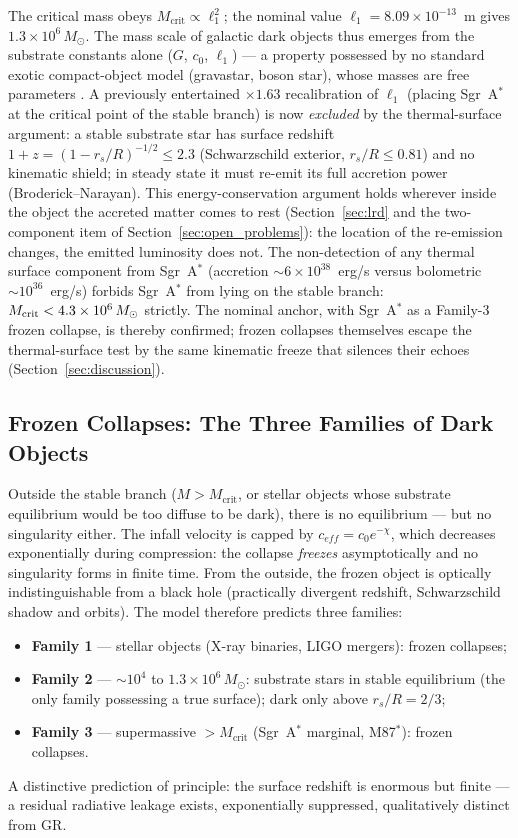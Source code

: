 \documentclass[11pt,a4paper]{article}
\theoremstyle{plain}
\theoremstyle{remark}
\begin{document}
The critical mass obeys $M_{\text{crit}} \propto \ell_1^2$; the nominal value $\ell_1 = 8.09\times10^{-13}$~m gives $1.3\times10^{6}\,M_\odot$. The mass scale of galactic dark objects thus emerges from the substrate constants alone ($G$, $c_0$, $\ell_1$) --- a property possessed by no standard exotic compact-object model (gravastar, boson star), whose masses are free parameters \cite{mazur2001, mazur2023}. A previously entertained $\times1.63$ recalibration of $\ell_1$ (placing Sgr~A$^*$ at the critical point of the stable branch) is now \emph{excluded} by the thermal-surface argument: a stable substrate star has surface redshift $1+z = (1 - r_s/R)^{-1/2} \le 2.3$ (Schwarzschild exterior, $r_s/R \le 0.81$) and no kinematic shield; in steady state it must re-emit its full accretion power (Broderick--Narayan). This energy-conservation argument holds wherever inside the object the accreted matter comes to rest (Section~\ref{sec:lrd} and the two-component item of Section~\ref{sec:open_problems}): the location of the re-emission changes, the emitted luminosity does not. The non-detection of any thermal surface component from Sgr~A$^*$ (accretion $\sim 6\times10^{38}$~erg/s versus bolometric $\sim 10^{36}$~erg/s) forbids Sgr~A$^*$ from lying on the stable branch: $M_{\rm crit} < 4.3\times10^{6}\,M_\odot$ strictly. The nominal anchor, with Sgr~A$^*$ as a Family-3 frozen collapse, is thereby confirmed; frozen collapses themselves escape the thermal-surface test by the same kinematic freeze that silences their echoes (Section~\ref{sec:discussion}).

\subsection{Frozen Collapses: The Three Families of Dark Objects}
Outside the stable branch ($M > M_{\text{crit}}$, or stellar objects whose substrate equilibrium would be too diffuse to be dark), there is no equilibrium --- but no singularity either. The infall velocity is capped by $c_{eff} = c_0 e^{-\chi}$, which decreases exponentially during compression: the collapse \emph{freezes} asymptotically and no singularity forms in finite time. From the outside, the frozen object is optically indistinguishable from a black hole (practically divergent redshift, Schwarzschild shadow and orbits). The model therefore predicts three families:
\begin{itemize}
    \item \textbf{Family 1} --- stellar objects (X-ray binaries, LIGO mergers): frozen collapses;
    \item \textbf{Family 2} --- $\sim10^{4}$ to $1.3\times10^{6}\,M_\odot$: substrate stars in stable equilibrium (the only family possessing a true surface); dark only above $r_s/R = 2/3$;
    \item \textbf{Family 3} --- supermassive $> M_{\text{crit}}$ (Sgr~A$^*$ marginal, M87$^*$): frozen collapses.
\end{itemize}
A distinctive prediction of principle: the surface redshift is enormous but finite --- a residual radiative leakage exists, exponentially suppressed, qualitatively distinct from GR.
\end{document}

